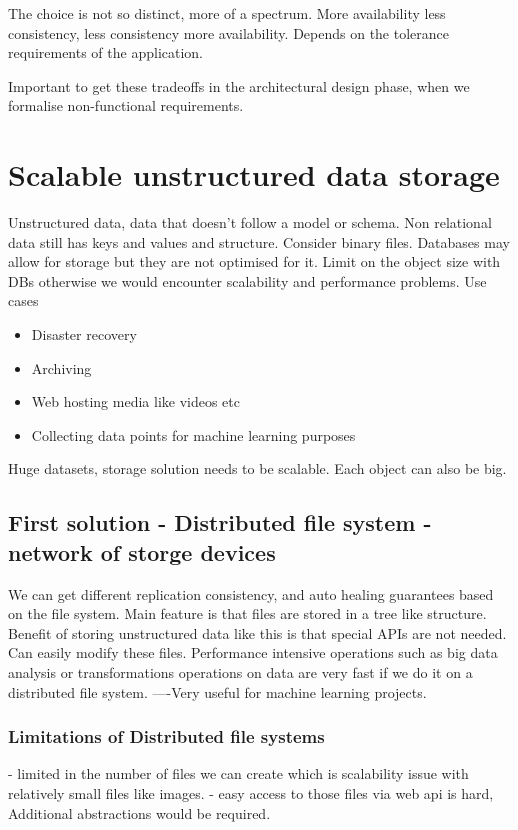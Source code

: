 \documentclass[a4paper, 11pt]{book}
\begin{document}
    The choice is not so distinct, more of a spectrum.
    More availability less consistency, less consistency more availability.
    Depends on the tolerance requirements of the application.

    Important to get these tradeoffs in the architectural design phase, when we formalise non-functional requirements.


    \section{Scalable unstructured data storage}
    Unstructured data, data that doesn't follow a model or schema.
    Non relational data still has keys and values and structure.
    Consider binary files.
    Databases may allow for storage but they are not optimised for it.
    Limit on the object size with DBs otherwise we would encounter scalability and performance problems.
    Use cases
    \begin{itemize}
    \item Disaster recovery
    \item Archiving
    \item Web hosting media like videos etc
    \item Collecting data points for machine learning purposes
    \end{itemize}

    Huge datasets, storage solution needs to be scalable.
    Each object can also be big.

    \subsection{First solution - Distributed file system - network of storge devices}
    We can get different replication consistency, and auto healing guarantees based on the file system.
    Main feature is that files are stored in a tree like structure.
    Benefit of storing unstructured data like this is that special APIs are not needed.
    Can easily modify these files.
    Performance intensive operations such as big data analysis or transformations operations on data are very fast if we do it on a distributed file system.
    ----Very useful for machine learning projects.

    \subsubsection{Limitations of Distributed file systems}
    - limited in the number of files we can create which is scalability issue with relatively small files like images.
    - easy access to those files via web api is hard, Additional abstractions would be required.
\end{document}

